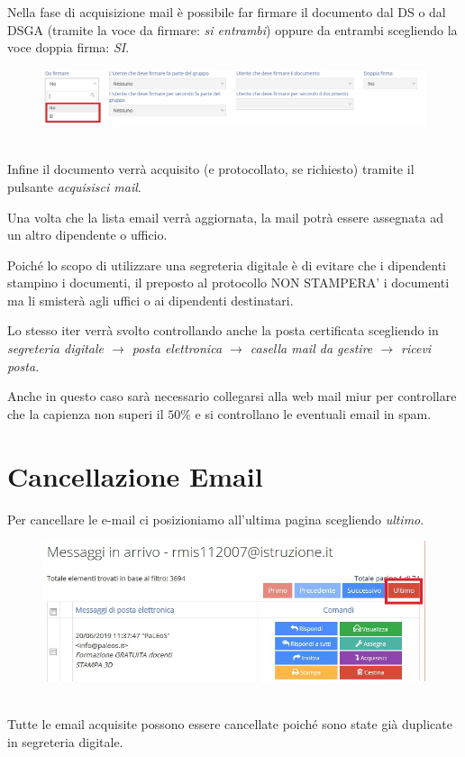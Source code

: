 \documentclass[a4paper,italian,12pt]{book}
\begin{document}
Nella fase di acquisizione mail è possibile far firmare il documento dal DS o dal DSGA (tramite la voce da firmare: \textit{si entrambi}) oppure da entrambi scegliendo la voce doppia firma: \textit{SI}.
\begin{figure}[ht]
\centering
\includegraphics[scale=0.5]{Figure/da_firmare.jpg} 
\end{figure} \\

Infine il documento verrà acquisito (e protocollato, se richiesto) tramite il pulsante \textit{acquisisci mail}.

Una volta che la lista email verrà aggiornata, la mail potrà essere assegnata ad un altro dipendente o ufficio.

Poiché lo scopo di utilizzare una segreteria digitale è di evitare che i dipendenti stampino i documenti, il preposto al protocollo NON STAMPERA' i documenti ma li smisterà agli uffici o ai dipendenti destinatari.

Lo stesso iter verrà svolto controllando anche la posta certificata scegliendo in \textit{segreteria digitale $\to$ posta elettronica $\to$ casella mail da gestire $\to$ ricevi posta}.

Anche in questo caso sarà necessario collegarsi alla web mail miur per controllare che la capienza non superi il $50\%$ e si controllano le eventuali email in spam.

\newpage
\section{Cancellazione Email}
Per cancellare le e-mail ci posizioniamo all'ultima pagina scegliendo \textit{ultimo}.
\begin{figure}[ht]
\centering
\includegraphics[scale=0.5]{Figure/ultimo.jpg} 
\end{figure} \\
Tutte le email acquisite possono essere cancellate poiché sono state già duplicate in segreteria digitale.
\end{document}
